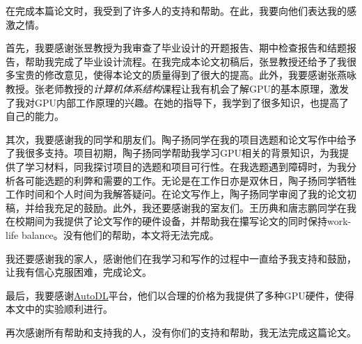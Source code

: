 
\begin{acknowledgements}

在完成本篇论文时，我受到了许多人的支持和帮助。在此，我要向他们表达我的感激之情。

首先，我要感谢张昱教授为我审查了毕业设计的开题报告、期中检查报告和结题报告，帮助我完成了毕业设计流程。在我完成本论文初稿后，张昱教授还给予了我很多宝贵的修改意见，使得本论文的质量得到了很大的提高。此外，我要感谢张燕咏教授。张老师教授的\emph{计算机体系结构}课程让我有机会了解GPU的基本原理，激发了我对GPU内部工作原理的兴趣。在她的指导下，我学到了很多知识，也提高了自己的能力。

其次，我要感谢我的同学和朋友们。陶子扬同学在我的项目选题和论文写作中给予了我很多支持。项目初期，陶子扬同学帮助我学习GPU相关的背景知识，为我提供了学习材料，同我探讨项目的选题和项目可行性。在我选题遇到障碍时，为我分析各可能选题的利弊和需要的工作。无论是在工作日亦是双休日，陶子扬同学牺牲工作时间和个人时间为我解答疑问。在论文写作上，陶子扬同学审阅了我的论文初稿，并给我充足的鼓励。此外，我还要感谢我的室友们。王历典和唐志鹏同学在我在校期间为我提供了论文写作的硬件设备，并帮助我在攥写论文的同时保持work-life balance。没有他们的帮助，本文将无法完成。

我还要感谢我的家人，感谢他们在我学习和写作的过程中一直给予我支持和鼓励，让我有信心克服困难，完成论文。

最后，我要感谢\href{https://www.autodl.com/home}{AutoDL}平台，他们以合理的价格为我提供了多种GPU硬件，使得本文中的实验顺利进行。

再次感谢所有帮助和支持我的人，没有你们的支持和帮助，我无法完成这篇论文。

\end{acknowledgements}
